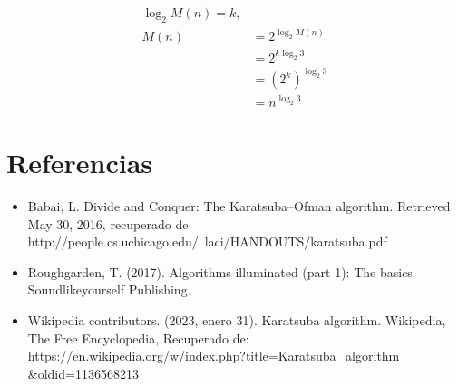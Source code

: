 \documentclass[a4paper,12pt]{article}
\begin{document}
\begin{align*}
	\log_2{M(n)} = k,\\
	M(n) &= 2^{\log_2{M(n)}} \\
	&= 2^{k\log_2{3}} \\
	&= (2^k)^{\log_2{3}}\\
	&= n^{\log_2{3}}
\end{align*}

\section{Referencias}

\begin{itemize}

\item Babai, L. Divide and Conquer: The Karatsuba–Ofman algorithm. Retrieved May 30, 2016, recuperado de \\ http://people.cs.uchicago.edu/~laci/HANDOUTS/karatsuba.pdf

\item Roughgarden, T. (2017). Algorithms illuminated (part 1): The basics. Soundlikeyourself Publishing.

\item Wikipedia contributors. (2023, enero 31). Karatsuba algorithm. Wikipedia, The Free Encyclopedia, Recuperado de:\\ https://en.wikipedia.org/w/index.php?title=Karatsuba\_algorithm \\ &oldid=1136568213

\end{itemize}
 
\end{document}
